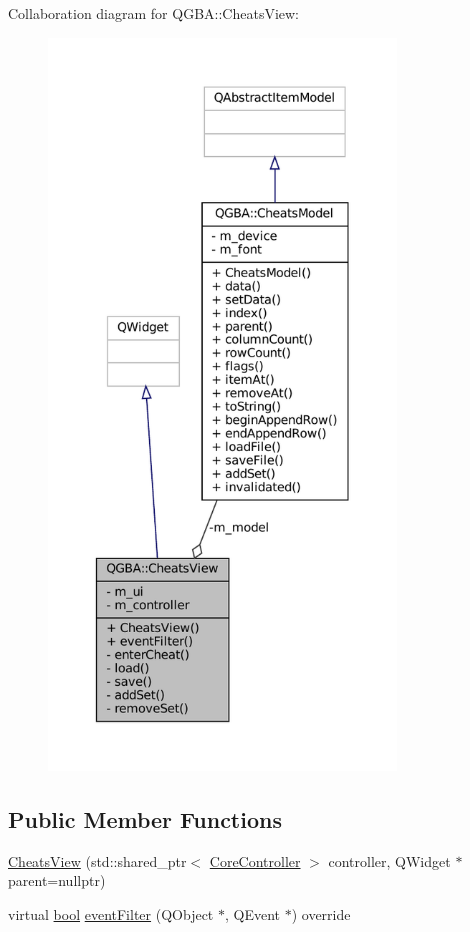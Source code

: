 Collaboration diagram for Q\+G\+BA\+:\+:Cheats\+View\+:
\nopagebreak
\begin{figure}[H]
\begin{center}
\leavevmode
\includegraphics[height=550pt]{class_q_g_b_a_1_1_cheats_view__coll__graph}
\end{center}
\end{figure}
\subsection*{Public Member Functions}
\begin{DoxyCompactItemize}
\item 
\mbox{\hyperlink{class_q_g_b_a_1_1_cheats_view_a8e5acfbee04e60d9b7a7a44dacb33297}{Cheats\+View}} (std\+::shared\+\_\+ptr$<$ \mbox{\hyperlink{class_q_g_b_a_1_1_core_controller}{Core\+Controller}} $>$ controller, Q\+Widget $\ast$parent=nullptr)
\item 
virtual \mbox{\hyperlink{libretro_8h_a4a26dcae73fb7e1528214a068aca317e}{bool}} \mbox{\hyperlink{class_q_g_b_a_1_1_cheats_view_a8fe7318a8e3e5e95e6555198cd94c8c1}{event\+Filter}} (Q\+Object $\ast$, Q\+Event $\ast$) override
\end{DoxyCompactItemize}
